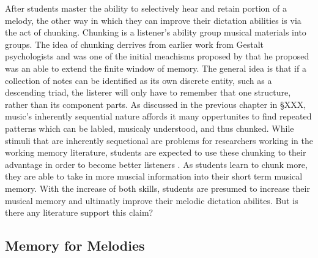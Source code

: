 \documentclass[]{book}
\begin{document}
After students master the ability to selectively hear and retain portion of a melody, the other way in which they can improve their dictation abilities is via the act of chunking.
Chunking is a listener's ability group musical materials into groups.
The idea of chunking derrives from earlier work from Gestalt psychologists and was one of the initial meachisms proposed by \citet{millerMagicalNumberSeven1956} that he proposed was an able to extend the finite window of memory.
The general idea is that if a collection of notes can be identified as its own discrete entity, such as a descending triad, the listerer will only have to remember that one structure, rather than its component parts.
As discussed in the previous chapter in §XXX, music's inherently sequential nature affords it many oppertunites to find repeated patterns which can be labled, musicaly understood, and thus chunked.
While stimuli that are inherently sequetional are problems for researchers working in the working memory literature, students are expected to use these chunking to their advantage in order to become better listeners .
As students learn to chunk more, they are able to take in more muscial information into their short term musical memory.
With the increase of both skills, students are presumed to increase their musical memory and ultimatly improve their melodic dictation abilites.
But is there any literature support this claim?

\hypertarget{memory-for-melodies}{%
\subsection{Memory for Melodies}\label{memory-for-melodies}}
\end{document}
